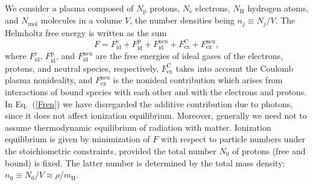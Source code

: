\documentclass{emulateapj}
\newcommand{\beq}{\begin{equation}}
\newcommand{\eeq}{\end{equation}}
\newcommand{\req}[1]{Eq.\ (\ref{#1})}
\newcommand{\mH}{m_\mathrm{H}}
\begin{document}
We consider a plasma composed of $N_\mathrm{p}$ protons, 
$N_\mathrm{e}$ electrons, $N_\mathrm{H}$
hydrogen atoms, and $N_\mathrm{mol}$ molecules in a volume $V$,
the number densities being $n_j\equiv N_j/V$.
The Helmholtz free energy is written as the sum
\beq
   F = F_\mathrm{id}^\mathrm{e} + F_\mathrm{id}^\mathrm{p} 
      + F_\mathrm{id}^\mathrm{neu}
       + F_\mathrm{ex}^\mathrm{C} + F_\mathrm{ex}^\mathrm{neu},
\label{Fren}
\eeq
where $F_\mathrm{id}^\mathrm{e}$, $F_\mathrm{id}^\mathrm{p}$, and
$F_\mathrm{id}^\mathrm{neu}$ are the free energies of ideal gases
of the electrons, protons, and neutral species, respectively, 
$F_\mathrm{ex}^\mathrm{C}$ takes into account the Coulomb plasma
nonideality, and $F_\mathrm{ex}^\mathrm{neu}$ is the nonideal
contribution which arises from interactions of bound species with
each other and with the electrons and protons. 
In \req{Fren} we have disregarded the additive contribution due
to photons, since it does not affect ionization equilibrium.
Moreover, generally we need not to assume thermodynamic
equilibrium of radiation with matter.
Ionization equilibrium is given by minimization of $F$ with
respect to particle numbers under the stoichiometric constraints,
provided the total number $N_0$ of protons (free and bound)
is fixed. The latter number is determined by the total mass
density:
$
  n_0 \equiv N_0/V \approx \rho/\mH.
$
\end{document}
